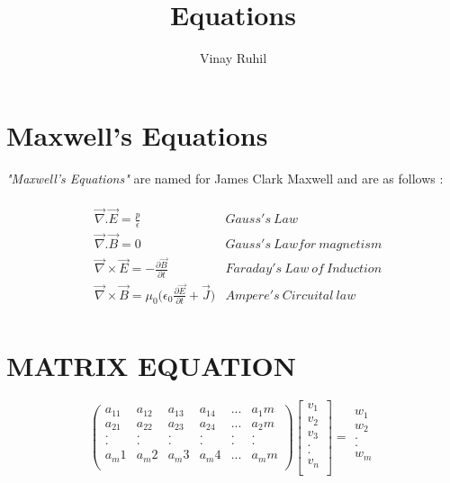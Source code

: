 \documentclass{article}
\title{\textbf{Equations}}
\author{Vinay Ruhil}
\begin{document}
\maketitle

\section{Maxwell's Equations}

\textit{"Maxwell's Equations"} are named for James Clark Maxwell and are as follows :
\\
\\

\begin{align*}
     &\Vec{\nabla} .\Vec{{E}} = \frac{p}{\epsilon}  &Gauss's \ Law  \\
     &\Vec{\nabla} .\Vec{{B}} = 0  &Gauss's \ Law for \ magnetism \\
     &\Vec{\nabla} \times \Vec{{E}} = -\frac{\partial\Vec{B}}{\partial t} &Faraday's \ Law \ of \ Induction \\
     &\Vec{\nabla} \times \Vec{{B}} = \mu_0\Bigg(\epsilon_0\frac{\partial \Vec{E}}{\partial t} + \Vec{J}\Bigg) & Ampere's \ Circuital \  law\\
\end{align*}



\section{\textbf{MATRIX EQUATION}}
\[
  \begin{pmatrix}
a_11 & a_12 & a_13 & a_14 &...& a_1m\\
a_21 & a_22 & a_23 & a_24 & ...& a_2m\\
. & . & . & . & . & . \\
. & . & . & . & . & . \\
a_m1 & a_m2 & a_m3 & a_m4 & ...& a_mm\\
\end{pmatrix}
\begin{bmatrix}
v_1 \\
 v_2 \\
v_3 \\
.\\
.\\
v_n\\
\end{bmatrix}
=
\begin{matrix}
w_1 \\
w_2\\
.\\
.\\
w_m\\
\end{matrix} 
\]
\end{document}
